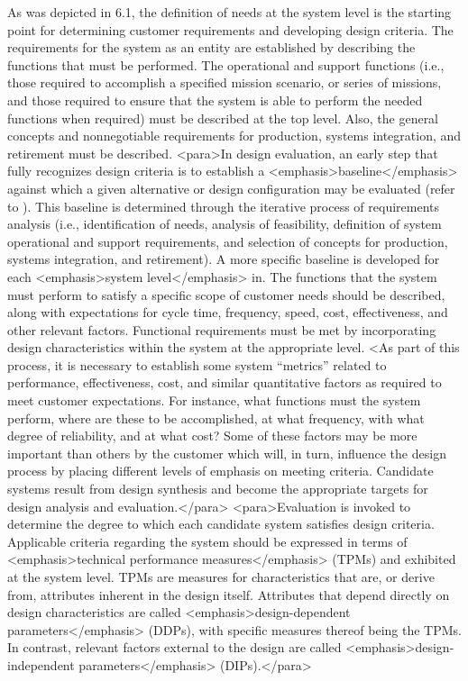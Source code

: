 As was depicted in 6.1, the definition of needs at the system level is the starting point for determining customer requirements and developing design criteria. The requirements for the system as an entity are established by describing the functions that must be performed. The operational and support functions (i.e., those required to accomplish a specified mission scenario, or series of missions, and those required to ensure that the system is able to perform the needed functions when required) must be described at the top level. Also, the general concepts and nonnegotiable requirements for production, systems integration, and retirement must be described.
<para>In design evaluation, an early step that fully recognizes design criteria is to establish a <emphasis>baseline</emphasis> against which a given alternative or design configuration may be evaluated (refer to ). This baseline is determined through the iterative process of requirements analysis (i.e., identification of needs, analysis of feasibility, definition of system operational and support requirements, and selection of concepts for production, systems integration, and retirement). A more specific baseline is developed for each <emphasis>system level</emphasis> in. The functions that the system must perform to satisfy a specific scope of customer needs should be described, along with expectations for cycle time, frequency, speed, cost, effectiveness, and other relevant factors. Functional requirements must be met by incorporating design characteristics within the system at the appropriate level.
<As part of this process, it is necessary to establish some system “metrics” related to performance, effectiveness, cost, and similar quantitative factors as required to meet customer expectations. For instance, what functions must the system perform, where are these to be accomplished, at what frequency, with what degree of reliability, and at what cost? Some of these factors may be more important than others by the customer which will, in turn, influence the design process by placing different levels of emphasis on meeting criteria. Candidate systems result from design synthesis and become the appropriate targets for design analysis and evaluation.</para>
<para>Evaluation is invoked to determine the degree to which each candidate system satisfies design criteria. Applicable criteria regarding the system should be expressed in terms of <emphasis>technical performance measures</emphasis> (TPMs) and exhibited at the system level. TPMs are measures for characteristics that are, or derive from, attributes inherent in the design itself. Attributes that depend directly on design characteristics are called <emphasis>design-dependent parameters</emphasis> (DDPs), with specific measures thereof being the TPMs. In contrast, relevant factors external to the design are called <emphasis>design-independent parameters</emphasis> (DIPs).</para>
